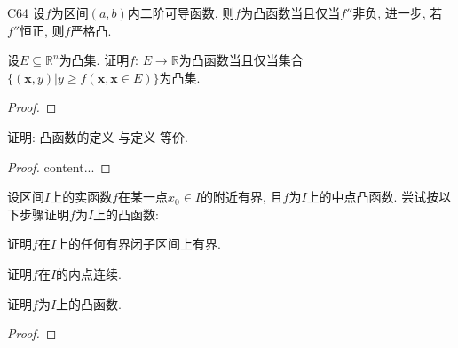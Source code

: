 \begin{theorem}{}{C64}
设\(f\)为区间\((a,b)\)内二阶可导函数, 则\(f\)为凸函数当且仅当\(f''\)非负, 进一步, 若\(f''\)恒正, 则\(f\)严格凸.
\end{theorem}
\begin{quiza}
\woe 设\(E\subseteq\mathbb{R}^n\)为凸集. 证明\(f:\, E\rightarrow\mathbb{R}\)为凸函数当且仅当集合\(\{(\boldsymbol{x},y)|y\geqslant f(\boldsymbol{x},\boldsymbol{x}\in E)\}\)为凸集.
\begin{proof}

\end{proof}
\woe 证明: 凸函数的定义  与定义  等价.
\begin{proof}
content...
\end{proof}
\woe 设区间\(I\)上的实函数\(f\)在某一点\(x_0\in I\)的附近有界, 且\(f\)为\(I\)上的中点凸函数. 尝试按以下步骤证明\(f\)为\(I\)上的凸函数:\begin{quizs}
\item 证明\(f\)在\(I\)上的任何有界闭子区间上有界.
\item 证明\(f\)在\(I\)的内点连续.
\item 证明\(f\)为\(I\)上的凸函数.
\end{quizs}
\begin{proof}


\end{proof}
\end{quiza}
